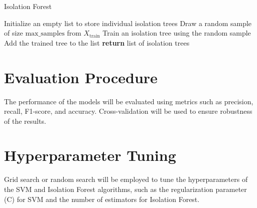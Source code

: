 \documentclass{article}
\begin{document}
\begin{algorithm}
    \caption{Isolation Forest}
    \begin{algorithmic}[1]
            \State Initialize an empty list to store individual isolation trees
                \State Draw a random sample of size $\text{max\_samples}$ from $X_{\text{train}}$
                \State Train an isolation tree using the random sample
                \State Add the trained tree to the list
            \EndFor
            \State \textbf{return} list of isolation trees
        \EndProcedure
    \end{algorithmic}
\end{algorithm}


\section{Evaluation Procedure}
The performance of the models will be evaluated using metrics such as precision, recall, F1-score, and accuracy. Cross-validation will be used to ensure robustness of the results.

\section{Hyperparameter Tuning}
Grid search or random search will be employed to tune the hyperparameters of the SVM and Isolation Forest algorithms, such as the regularization parameter (C) for SVM and the number of estimators for Isolation Forest.

\printbibliography
\end{document}
